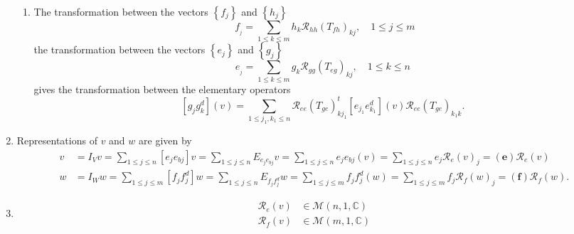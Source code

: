 \documentclass[aps,preprint]{revtex4}%
\begin{document}
\begin{enumerate}
\begin{enumerate}
\item The transformation between the vectors $\left\{  f_{j}\right\}  $ and
$\left\{  h_{j}\right\}  $%
\begin{equation}
\ \ f_{_{j}}=\sum_{1\leq k\leq m}h_{k}\mathcal{R}_{hh}\left(  T_{fh}\right)
_{kj},\quad1\leq j\leq m
\end{equation}
the transformation between the vectors $\left\{  e_{j}\right\}  $ and
$\left\{  g_{j}\right\}  $%
\begin{equation}
e_{_{j}}=\sum_{1\leq k\leq m}g_{k}\mathcal{R}_{gg}\left(  T_{eg}\right)
_{kj},\quad1\leq k\leq n
\end{equation}
gives the transformation between the elementary operators%
\begin{equation}
\left[  g_{j}g_{k}^{d}\right]  \left(  v\right)  =\sum_{1\leq j_{1},k_{1}\leq
n}\mathcal{R}_{ee}\left(  T_{ge}\right)  _{kj_{1}}^{t}\left[  e_{j_{1}%
}e_{k_{1}}^{d}\right]  \left(  v\right)  \mathcal{R}_{ee}\left(
T_{ge}\right)  _{k_{1}k}.
\end{equation}

\end{enumerate}

\item Representations of $v$ and $w$ are given by
\begin{align}
v  &  =I_{V}v=\sum_{1\leq j\leq n}\left[  e_{j}e_{bj}\right]  v=\sum_{1\leq
j\leq n}E_{e_{j}e_{bj}}v=\sum_{1\leq j\leq n}e_{j}e_{bj}\left(  v\right)
=\sum_{1\leq j\leq n}e_{j}\mathcal{R}_{e}\left(  v\right)  _{j}=\left(
\boldsymbol{e}\right)  \mathcal{R}_{e}\left(  v\right) \\
w  &  =I_{W}w=\sum_{1\leq j\leq m}\left[  f_{j}f_{j}^{d}\right]  w=\sum_{1\leq
j\leq n}E_{f_{j}f_{j}^{d}}w=\sum_{1\leq j\leq m}f_{j}f_{j}^{d}\left(
w\right)  =\sum_{1\leq j\leq m}f_{j}\mathcal{R}_{f}\left(  w\right)
_{j}=\left(  \boldsymbol{f}\right)  \mathcal{R}_{f}\left(  w\right)  .
\end{align}


\item
\begin{align}
\mathcal{R}_{e}\left(  v\right)   &  \in\mathcal{M}\left(  n,1,\mathbb{C}%
\right) \\
\mathcal{R}_{f}\left(  v\right)   &  \in\mathcal{M}\left(  m,1,\mathbb{C}%
\right)
\end{align}



\end{enumerate}
\end{document}
